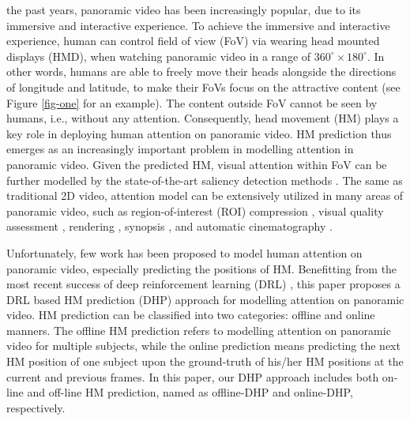 \documentclass[10pt,journal,compsoc]{IEEEtran}
\begin{document}
%
%
%
%
 the past years, panoramic video \cite{neumann2000immersive} has been increasingly popular, due to its immersive and interactive experience.
To achieve the immersive and interactive experience, human can control field of view (FoV) via wearing head mounted displays (HMD), when watching panoramic video in a range of $360^{\circ} \times 180^{\circ}$.
In other words, humans are able to freely move their heads alongside the directions of longitude and latitude, to make their FoVs focus on the attractive content (see Figure \ref{fig-one} for an example).
The content outside FoV cannot be seen by humans, i.e., without any attention.
Consequently, head movement (HM) plays a key role in deploying human attention on panoramic video.
HM prediction thus emerges as an increasingly important problem in modelling attention in panoramic video.
Given the predicted HM, visual attention within FoV can be further modelled by the state-of-the-art saliency detection methods \cite{borji2013state}.
The same as traditional 2D video, attention model can be extensively utilized in many areas of panoramic video, such as region-of-interest (ROI) compression \cite{de2016video}, visual quality assessment \cite{gaddam2016tiling}, rendering \cite{stengel2016gaze}, synopsis \cite{Pritch08}, and automatic cinematography \cite{su2016pano2vid}.

Unfortunately, few work has been proposed to model human attention on panoramic video, especially predicting the positions of HM.
Benefitting from the most recent success of deep reinforcement learning (DRL) \cite{mnih2016asynchronous}, this paper proposes a DRL based HM prediction (DHP) approach for modelling attention on panoramic video.
HM prediction can be classified into two categories: offline and online manners.
The offline HM prediction refers to modelling attention on panoramic video for multiple subjects, while the online prediction means predicting the next HM position of one subject upon the ground-truth of his/her HM positions at the current and previous frames. In this paper, our DHP approach includes both on-line and off-line HM prediction, named as offline-DHP and online-DHP, respectively.
\end{document}
